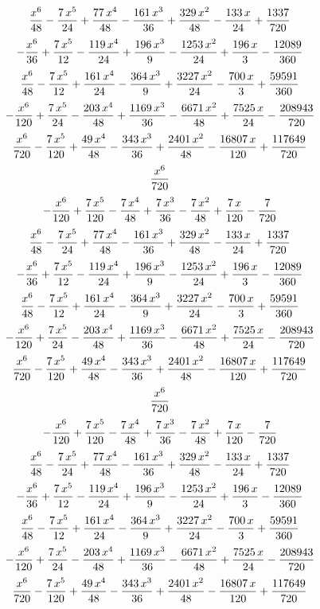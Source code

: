 $${{x^6}\over{48}}-{{7\,x^5}\over{24}}+{{77\,x^4}\over{48}}-{{161\,x^
 3}\over{36}}+{{329\,x^2}\over{48}}-{{133\,x}\over{24}}+{{1337}\over{
 720}}$$
$$-{{x^6}\over{36}}+{{7\,x^5}\over{12}}-{{119\,x^4}\over{24}}+{{196\,
 x^3}\over{9}}-{{1253\,x^2}\over{24}}+{{196\,x}\over{3}}-{{12089
 }\over{360}}$$
$${{x^6}\over{48}}-{{7\,x^5}\over{12}}+{{161\,x^4}\over{24}}-{{364\,x
 ^3}\over{9}}+{{3227\,x^2}\over{24}}-{{700\,x}\over{3}}+{{59591
 }\over{360}}$$
$$-{{x^6}\over{120}}+{{7\,x^5}\over{24}}-{{203\,x^4}\over{48}}+{{1169
 \,x^3}\over{36}}-{{6671\,x^2}\over{48}}+{{7525\,x}\over{24}}-{{
 208943}\over{720}}$$
$${{x^6}\over{720}}-{{7\,x^5}\over{120}}+{{49\,x^4}\over{48}}-{{343\,
 x^3}\over{36}}+{{2401\,x^2}\over{48}}-{{16807\,x}\over{120}}+{{
 117649}\over{720}}$$
$${{x^6}\over{720}}$$
$$-{{x^6}\over{120}}+{{7\,x^5}\over{120}}-{{7\,x^4}\over{48}}+{{7\,x^
 3}\over{36}}-{{7\,x^2}\over{48}}+{{7\,x}\over{120}}-{{7}\over{720}}$$
$${{x^6}\over{48}}-{{7\,x^5}\over{24}}+{{77\,x^4}\over{48}}-{{161\,x^
 3}\over{36}}+{{329\,x^2}\over{48}}-{{133\,x}\over{24}}+{{1337}\over{
 720}}$$
$$-{{x^6}\over{36}}+{{7\,x^5}\over{12}}-{{119\,x^4}\over{24}}+{{196\,
 x^3}\over{9}}-{{1253\,x^2}\over{24}}+{{196\,x}\over{3}}-{{12089
 }\over{360}}$$
$${{x^6}\over{48}}-{{7\,x^5}\over{12}}+{{161\,x^4}\over{24}}-{{364\,x
 ^3}\over{9}}+{{3227\,x^2}\over{24}}-{{700\,x}\over{3}}+{{59591
 }\over{360}}$$
$$-{{x^6}\over{120}}+{{7\,x^5}\over{24}}-{{203\,x^4}\over{48}}+{{1169
 \,x^3}\over{36}}-{{6671\,x^2}\over{48}}+{{7525\,x}\over{24}}-{{
 208943}\over{720}}$$
$${{x^6}\over{720}}-{{7\,x^5}\over{120}}+{{49\,x^4}\over{48}}-{{343\,
 x^3}\over{36}}+{{2401\,x^2}\over{48}}-{{16807\,x}\over{120}}+{{
 117649}\over{720}}$$
$${{x^6}\over{720}}$$
$$-{{x^6}\over{120}}+{{7\,x^5}\over{120}}-{{7\,x^4}\over{48}}+{{7\,x^
 3}\over{36}}-{{7\,x^2}\over{48}}+{{7\,x}\over{120}}-{{7}\over{720}}$$
$${{x^6}\over{48}}-{{7\,x^5}\over{24}}+{{77\,x^4}\over{48}}-{{161\,x^
 3}\over{36}}+{{329\,x^2}\over{48}}-{{133\,x}\over{24}}+{{1337}\over{
 720}}$$
$$-{{x^6}\over{36}}+{{7\,x^5}\over{12}}-{{119\,x^4}\over{24}}+{{196\,
 x^3}\over{9}}-{{1253\,x^2}\over{24}}+{{196\,x}\over{3}}-{{12089
 }\over{360}}$$
$${{x^6}\over{48}}-{{7\,x^5}\over{12}}+{{161\,x^4}\over{24}}-{{364\,x
 ^3}\over{9}}+{{3227\,x^2}\over{24}}-{{700\,x}\over{3}}+{{59591
 }\over{360}}$$
$$-{{x^6}\over{120}}+{{7\,x^5}\over{24}}-{{203\,x^4}\over{48}}+{{1169
 \,x^3}\over{36}}-{{6671\,x^2}\over{48}}+{{7525\,x}\over{24}}-{{
 208943}\over{720}}$$
$${{x^6}\over{720}}-{{7\,x^5}\over{120}}+{{49\,x^4}\over{48}}-{{343\,
 x^3}\over{36}}+{{2401\,x^2}\over{48}}-{{16807\,x}\over{120}}+{{
 117649}\over{720}}$$
